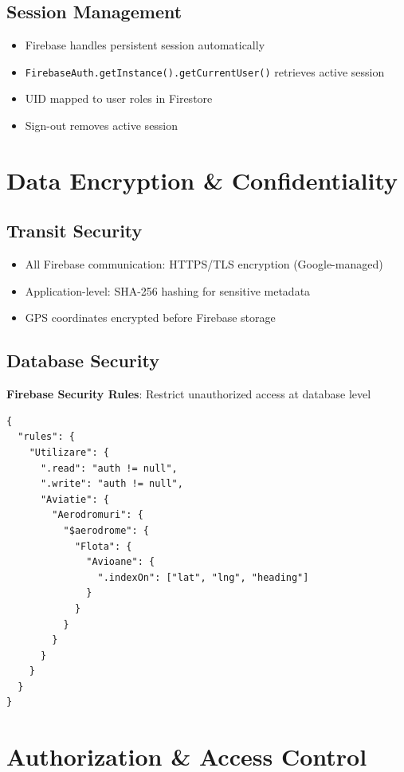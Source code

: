\documentclass[11pt,a4paper]{report}
\begin{document}
\subsection{Session Management}

\begin{itemize}
    \item Firebase handles persistent session automatically
    \item \texttt{FirebaseAuth.getInstance().getCurrentUser()} retrieves active session
    \item UID mapped to user roles in Firestore
    \item Sign-out removes active session
\end{itemize}

\section{Data Encryption \& Confidentiality}

\subsection{Transit Security}

\begin{itemize}
    \item All Firebase communication: HTTPS/TLS encryption (Google-managed)
    \item Application-level: SHA-256 hashing for sensitive metadata
    \item GPS coordinates encrypted before Firebase storage
\end{itemize}

\subsection{Database Security}

\textbf{Firebase Security Rules}: Restrict unauthorized access at database level

\begin{lstlisting}
{
  "rules": {
    "Utilizare": {
      ".read": "auth != null",
      ".write": "auth != null",
      "Aviatie": {
        "Aerodromuri": {
          "$aerodrome": {
            "Flota": {
              "Avioane": {
                ".indexOn": ["lat", "lng", "heading"]
              }
            }
          }
        }
      }
    }
  }
}
\end{lstlisting}

\section{Authorization \& Access Control}
\end{document}
